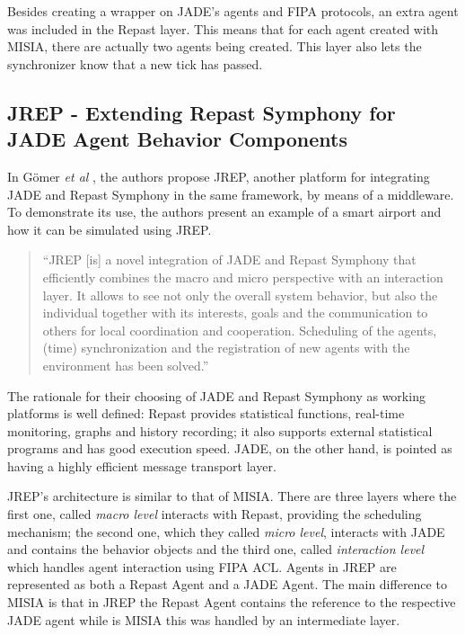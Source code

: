 	Besides creating a wrapper on JADE's agents and FIPA protocols, an extra agent was included in the Repast layer. This means that for each agent created with MISIA, there are actually two agents being created. This layer also lets the synchronizer know that a new tick has passed.

\subsection{JREP - Extending Repast Symphony for JADE Agent Behavior Components}
	In Gömer \textit{et al} \cite{gormer2011jrep}, the authors propose JREP, another platform for integrating JADE and Repast Symphony in the same framework, by means of a middleware. To demonstrate its use, the authors present an example of a smart airport and how it can be simulated using JREP.

\begin{quote}
	``JREP [is] a novel integration of JADE and Repast Symphony that efficiently combines the macro and micro perspective with an interaction layer. It allows to see not only the overall system behavior, but also the individual together with its interests, goals and the communication to
	others for local coordination and cooperation. Scheduling of the agents, (time) synchronization and the registration of new agents with the environment has been solved.'' \cite{gormer2011jrep}
\end{quote}

	The rationale for their choosing of JADE and Repast Symphony as working platforms is well defined:
	Repast provides statistical functions, real-time monitoring, graphs and history recording; it also supports external statistical programs and has good execution speed.
	JADE, on the other hand, is pointed as having a highly efficient message transport layer. 

	JREP's architecture is similar to that of MISIA. There are three layers where the first one, called \textit{macro level} interacts with Repast, providing the scheduling mechanism; the second one, which they called \textit{micro level}, interacts with JADE and contains the behavior objects and the third one, called \textit{interaction level} which handles agent interaction using FIPA ACL.
	Agents in JREP are represented as both a Repast Agent and a JADE Agent. The main difference to MISIA is that in JREP the Repast Agent contains the reference to the respective JADE agent while is MISIA this was handled by an intermediate layer.

